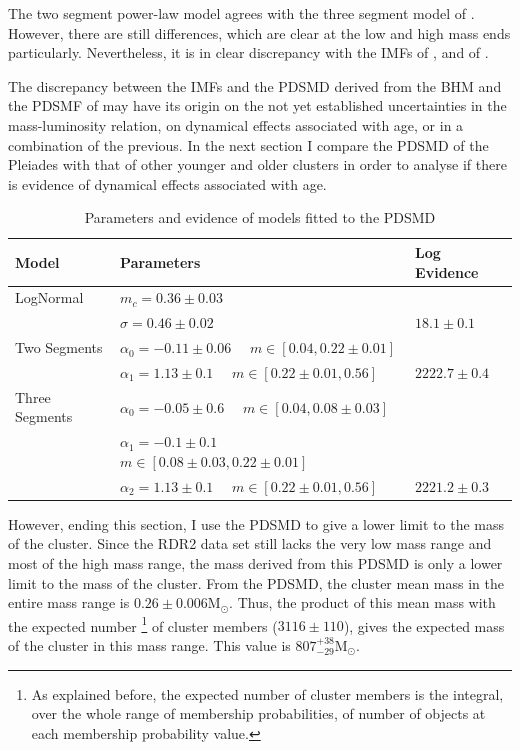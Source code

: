 The two segment power-law model agrees with the three segment model of \citet{Bouy2015}. However, there are still differences, which are clear at the low and high mass ends particularly. Nevertheless, it is in clear discrepancy with the IMFs of \citet{Chabrier2005},  \cite[$m_c=0.25_{-0.016}^{+0.021}$ and $\sigma=0.55_{-0.01}^{+0.05}$, the uncertainties are those reported by][for single objects]{Chabrier2003b} and of \citet{Thies2007}. 

The discrepancy between the IMFs and the PDSMD derived from the BHM and the PDSMF of \citet{Bouy2015} may have its origin on the not yet established uncertainties in the mass-luminosity relation, on dynamical effects associated with age, or in a combination of the previous. In the next section I compare the PDSMD of the Pleiades with that of other younger and older clusters in order to analyse if there is evidence of dynamical effects associated with age.

\begin{table}[ht!]
\caption{Parameters and evidence of models fitted to the PDSMD}
\begin{center}
\begin{tabular}{lll}
Model&Parameters& Log Evidence\\
\hline
LogNormal&$m_c=0.36\pm0.03$&\\
                 &$\sigma=0.46\pm0.02$ & $18.1 \pm 0.1$\\
\hline
Two Segments &$\alpha_0=-0.11\pm0.06$ \ \ $m \in [0.04,0.22\pm0.01]$ & \\ 
&  $\alpha_1=1.13\pm0.1$ \ \ $m \in [0.22\pm0.01,0.56]$&$2222.7\pm0.4$\\
\hline
Three Segments &$\alpha_0=-0.05\pm0.6$ \ \ $m \in [0.04,0.08\pm0.03]$ & \\
                          &$\alpha_1=-0.1\pm0.1$ \ \ $m \in [0.08\pm0.03,0.22\pm0.01]$ & \\ 
                          &$\alpha_2=1.13\pm0.1$ \ \ $m \in [0.22\pm0.01,0.56]$&$2221.2\pm 0.3$\\
\hline
\end{tabular}
\end{center}
\label{tab:fitPDSMD}
\end{table}%

However, ending this section, I use the PDSMD to give a lower limit to the mass of the cluster. Since the RDR2 data set  still lacks the very low mass range and most of the high mass range, the mass derived from this PDSMD is only a lower limit to the mass of the cluster. From the PDSMD, the cluster mean mass in the entire mass range is $0.26 \pm 0.006 \mathrm{M_{\odot}}$. Thus, the product of this mean mass with the expected number \footnote{As explained before, the expected number of cluster members is the integral, over the whole range of membership probabilities, of number of objects at each membership probability value.} of cluster members ($3116 \pm 110$), gives the expected mass of the cluster in this mass range. This  value is $807^{+38}_{-29} \mathrm{M_{\odot}}$. 

